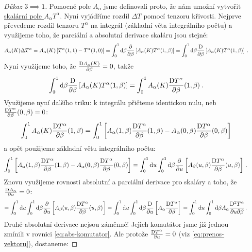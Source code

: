 \documentclass{article}
\begin{document}
\begin{proof}[Důkaz $3 \implies 1$]
    Pomocné pole $A_\alpha$ jsme definovali proto, že nám umožní vytvořit \underline{skalární pole $A_\alpha T^\alpha$}. Nyní vyjádříme rozdíl $\Delta T$ pomocí tenzoru křivosti. Nejprve převedeme rozdíl tenzoru $T^\alpha$ na integrál (základní věta integrálního počtu) a využijeme toho, že parciální a absolutní derivace skaláru jsou stejné:
    \begin{align}
        A_\alpha(K) \Delta T^\alpha 
        = A_\alpha(K) \left[ T^\alpha(1,1) - T^\alpha(1,0) \right] 
        = \int_0^1 \mathrm{d} \beta \frac{\partial }{\partial \beta} \left[ A_\alpha(K) T^\alpha(1, \beta) \right] 
        = \int_0^1 \mathrm{d} \beta \frac{\mathrm{D} }{\partial \beta} \left[ A_\alpha(K) T^\alpha(1, \beta) \right] \:.
    \end{align}
    Nyní využijeme toho, že $\frac{\mathrm{D} A_\alpha(K)}{\partial \beta} = 0$, takže
    \begin{align}
        \int_0^1 \mathrm{d} \beta \frac{\mathrm{D} }{\partial \beta} \left[ A_\alpha(K) T^\alpha(1, \beta) \right] = \int_0^1 A_\alpha(K) \frac{\mathrm{D} T^\alpha}{\partial \beta}(1,\beta) \:.
    \end{align}
    Využijeme nyní dalšího triku: k integrálu přičteme identickou nulu, neb $\frac{\mathrm{D} T^\alpha}{\partial \beta}(0,\beta) = 0$:
    \begin{align}
        \int_0^1 A_\alpha(K) \frac{\mathrm{D} T^\alpha}{\partial \beta}(1,\beta)
        = \int_0^1 \left[ A_\alpha(1,\beta) \frac{\mathrm{D} T^\alpha}{\partial \beta}(1,\beta) - A_\alpha(0,\beta) \frac{\mathrm{D} T^\alpha}{\partial \beta}(0,\beta) \right]
    \end{align}
    a opět použijeme základní větu integrálního počtu:
    \begin{align}
        \int_0^1 \left[ A_\alpha(1,\beta) \frac{\mathrm{D} T^\alpha}{\partial \beta}(1,\beta) - A_\alpha(0,\beta) \frac{\mathrm{D} T^\alpha}{\partial \beta}(0,\beta) \right] 
        = \int_0^1 \mathrm{d} u \int_0^1 \mathrm{d} \beta \frac{\partial }{\partial u} \left[ A_\beta(u,\beta) \frac{\mathrm{D} T^\alpha}{\partial \beta} (u,\beta) \right] \:.
    \end{align}
    Znovu využijeme rovnosti absolutní a parciální derivace pro skaláry a toho, že $\frac{\mathrm{D} A_\alpha}{\partial u} = 0$:
    \begin{align}
        = \int_0^1 \mathrm{d} u \int_0^1 \mathrm{d} \beta \frac{\partial }{\partial u} \left[ A_\beta(u,\beta) \frac{\mathrm{D} T^\alpha}{\partial \beta} (u,\beta) \right] 
        = \int_0^1 \mathrm{d} u \int_0^1 \mathrm{d} \beta \frac{\mathrm{D} }{\partial u} \left[ A_\alpha \frac{\mathrm{D} T^\alpha}{\partial \beta}\right] 
        = \int_0^1 \mathrm{d} u \int_0^1 \mathrm{d} \beta A_\alpha \frac{\mathrm{D}^2 T^\alpha}{\partial u \partial \beta} \:.
    \end{align}
    Druhé absolutní derivace nejsou záměnné! Jejich komutátor jsme již jednou zmínili v rovnici \eqref{eq:abs-komutator}. Ale protože $\frac{\mathrm{D} T^\alpha}{\partial u} = 0$ (viz \eqref{eq:prenos-vektoru}), dostaneme:

\end{proof}
\end{document}
